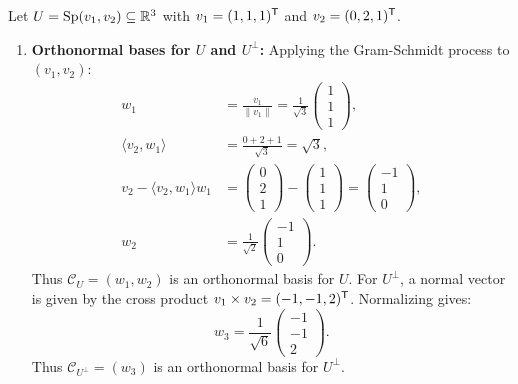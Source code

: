 \begin{exercisesolution*}
\label{sol:orthogonal_projection_computation}
Let $U = \operatorname{Sp}(v_1, v_2) \subseteq \mathbb{R}^3$ with $v_1 = (1, 1, 1)^{\mathsf{T}}$ and $v_2 = (0, 2, 1)^{\mathsf{T}}$.
\begin{enumerate}[label=\textbf{(\alph*)}]
    \item \textbf{Orthonormal bases for $U$ and $U^\perp$:}
    Applying the Gram-Schmidt process to $(v_1, v_2)$:
    \begin{align*}
    w_1 &= \frac{v_1}{\|v_1\|} = \frac{1}{\sqrt{3}}\begin{pmatrix} 1 \\ 1 \\ 1 \end{pmatrix}, \\
    \langle v_2, w_1 \rangle &= \frac{0 + 2 + 1}{\sqrt{3}} = \sqrt{3}, \\
    v_2 - \langle v_2, w_1 \rangle w_1 &= \begin{pmatrix} 0 \\ 2 \\ 1 \end{pmatrix} - \begin{pmatrix} 1 \\ 1 \\ 1 \end{pmatrix} = \begin{pmatrix} -1 \\ 1 \\ 0 \end{pmatrix}, \\
    w_2 &= \frac{1}{\sqrt{2}}\begin{pmatrix} -1 \\ 1 \\ 0 \end{pmatrix}.
    \end{align*}
    Thus $\mathcal{C}_U = (w_1, w_2)$ is an orthonormal basis for $U$.
    For $U^\perp$, a normal vector is given by the cross product $v_1 \times v_2 = (-1, -1, 2)^{\mathsf{T}}$. Normalizing gives:
    \[
    w_3 = \frac{1}{\sqrt{6}}\begin{pmatrix} -1 \\ -1 \\ 2 \end{pmatrix}.
    \]
    Thus $\mathcal{C}_{U^\perp} = (w_3)$ is an orthonormal basis for $U^\perp$.


\end{enumerate}
\end{exercisesolution*}
